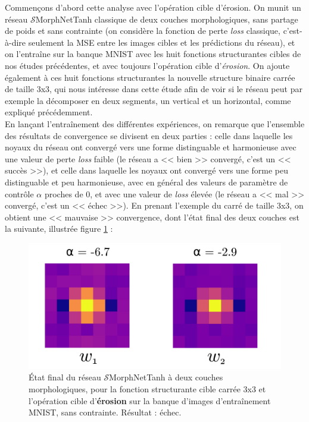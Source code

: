 Commençons d'abord cette analyse avec l'opération cible d'érosion. On munit un réseau $\mathcal{S}$MorphNetTanh classique de deux couches morphologiques, sans partage de poids et sans contrainte (on considère la fonction de perte \textit{loss} classique, c'est-à-dire seulement la MSE entre les images cibles et les prédictions du réseau), et on l'entraîne sur la banque MNIST avec les huit fonctions structurantes cibles de nos études précédentes, et avec toujours l'opération cible d'\textit{érosion}. On ajoute également à ces huit fonctions structurantes la nouvelle structure binaire carrée de taille 3x3, qui nous intéresse dans cette étude afin de voir si le réseau peut par exemple la décomposer en deux segments, un vertical et un horizontal, comme expliqué précédemment. \\

\vspace{-1.0mm}
\noindent En lançant l'entraînement des différentes expériences, on remarque que l'ensemble des résultats de convergence se divisent en deux parties : celle dans laquelle les noyaux du réseau ont convergé vers une forme distinguable et harmonieuse avec une valeur de perte \textit{loss} faible (le réseau a << bien >> convergé, c'est un << succès >>), et celle dans laquelle les noyaux ont convergé vers une forme peu distinguable et peu harmonieuse, avec en général des valeurs de paramètre de contrôle $\alpha$ proches de 0, et avec une valeur de \textit{loss} élevée (le réseau a << mal >> convergé, c'est un << échec >>).
En prenant l'exemple du carré de taille 3x3, on obtient une << mauvaise >> convergence, dont l'état final des deux couches est la suivante, illustrée figure \ref{fig:square_fail} : \\

\vspace{1.6mm}
\begin{figure}[!htp]
  \begin{center}
    \includegraphics[width=0.36\linewidth]{parts/4-analyse_des_reseaux/deux_couches_pour_OPfondamentale/figures/square_fail.pdf}
    \vspace{1.0mm}
    \caption{ \centering État final du réseau $\mathcal{S}$MorphNetTanh à deux couches morphologiques, pour la fonction structurante cible carrée 3x3 et l'opération cible d'\textbf{érosion} sur la banque d'images d'entraînement MNIST, sans contrainte. Résultat : échec.}
    \label{fig:square_fail}
  \end{center}
\end{figure}

